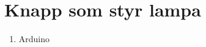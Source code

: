 \documentclass[11pt]{article}
\begin{document}
\raggedright

\section{Knapp som styr lampa}
\begin{enumerate}[itemsep=2em]
\item Arduino
\end{enumerate}
\end{document}
